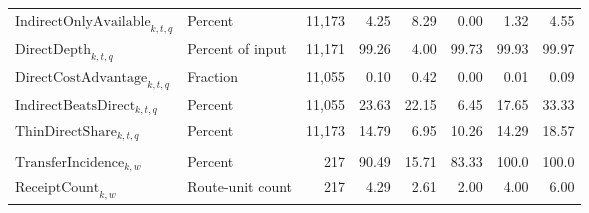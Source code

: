 \begin{tabularx}{\linewidth}{@{}>{\raggedright\arraybackslash}X>{\raggedright\arraybackslash}Xrrrrrr@{}}
$\mathrm{IndirectOnlyAvailable}_{k,t,q}$ & Percent & 11,173 & 4.25 & 8.29 & 0.00 & 1.32 & 4.55 \\
$\mathrm{DirectDepth}_{k,t,q}$ & Percent of input & 11,171 & 99.26 & 4.00 & 99.73 & 99.93 & 99.97 \\
$\mathrm{DirectCostAdvantage}_{k,t,q}$ & Fraction & 11,055 & 0.10 & 0.42 & 0.00 & 0.01 & 0.09 \\
$\mathrm{IndirectBeatsDirect}_{k,t,q}$ & Percent & 11,055 & 23.63 & 22.15 & 6.45 & 17.65 & 33.33 \\
$\mathrm{ThinDirectShare}_{k,t,q}$ & Percent & 11,173 & 14.79 & 6.95 & 10.26 & 14.29 & 18.57 \\
\addlinespace
\multicolumn{8}{l}{\textit{Settlement-transfer sample}} \\
$\mathrm{TransferIncidence}_{k,w}$ & Percent & 217 & 90.49 & 15.71 & 83.33 & 100.0 & 100.0 \\
$\mathrm{ReceiptCount}_{k,w}$ & Route-unit count & 217 & 4.29 & 2.61 & 2.00 & 4.00 & 6.00 \\
\bottomrule
\end{tabularx}
\endgroup
